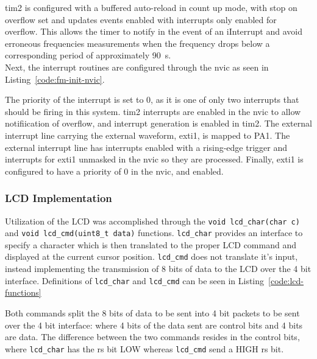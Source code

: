 
\gls{tim2} is configured with a buffered auto-reload in count up mode,
with stop on overflow set and updates events enabled with interrupts
only enabled for overflow. This allows the timer to notify in the event
of an iInterrupt and avoid erroneous frequencies measurements when the
frequency drops below a corresponding period of approximately
\SI{90}{s}. \\

Next, the interrupt routines are configured through the \gls{nvic} as
seen in Listing~\ref{code:fm-init-nvic}.


The priority of the interrupt is set to 0, as it is one of only two
interrupts that should be firing in this system. \gls{tim2} interrupts
are enabled in the \gls{nvic} to allow notifiication of overflow, and
interrupt generation is enabled in \gls{tim2}. The external interrupt
line carrying the external waveform, \gls{exti1}, is mapped to PA1. The
external interrupt line has interrupts enabled with a rising-edge
trigger and interrupts for \gls{exti1} unmasked in the \gls{nvic} so
they are processed. Finally, \gls{exti1} is configured to have a
priority  of 0 in the \gls{nvic}, and enabled.

\subsubsection{LCD Implementation} \label{sec:lcd-imp}
Utilization of the LCD was accomplished through the
\lstinline{void lcd_char(char c)} and
\lstinline{void lcd_cmd(uint8_t data)} functions. \lstinline{lcd_char}
provides an interface to specify a character which is then translated to
the proper LCD command and displayed at the current cursor position.
\lstinline{lcd_cmd} does not translate it's input, instead implementing
the transmission of 8 bits of data to the LCD over the 4 bit interface.
Definitions of \lstinline{lcd_char} and \lstinline{lcd_cmd} can be seen
in Listing~\ref{code:lcd-functions}


Both commands split the 8 bits of data to be sent into 4 bit packets to
be sent over the 4 bit interface: where 4 bits of the data sent are
control bits and 4 bits are data. The difference between the two
commands resides in the control bits, where \lstinline{lcd_char} has the
\gls{rs} bit LOW whereas \lstinline{lcd_cmd} send a HIGH \gls{rs} bit.
\\


